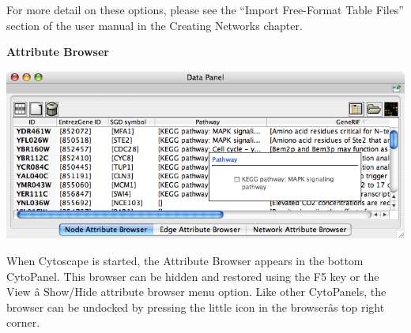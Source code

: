  For more detail on these options, please see the ``Import Free-Format Table Files'' section of the user manual in the Creating Networks chapter. 


 

\textbf{Attribute Browser}


 \includegraphics[width=\textwidth]{images/attribute_browser26.png} 


 When Cytoscape is started, the Attribute Browser appears in the bottom CytoPanel. This browser can be hidden and restored using the F5 key or the View \^a Show/Hide attribute browser menu option. Like other CytoPanels, the browser can be undocked by pressing the little icon in the browser\^as top right corner. 


